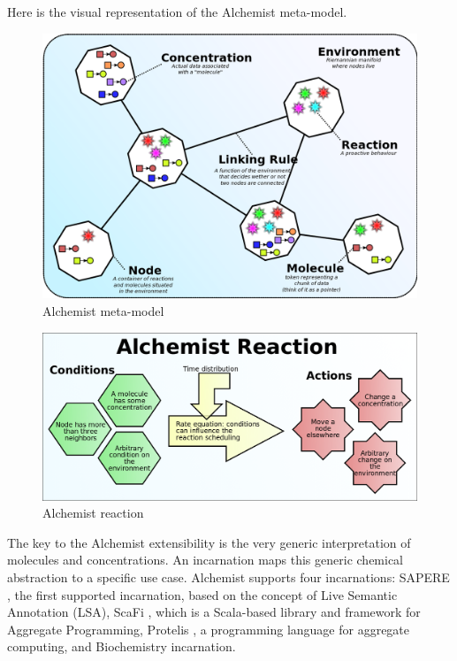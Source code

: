 \documentclass[12pt,a4paper,openright,twoside]{book}
\begin{document}
Here is the visual representation of the Alchemist meta-model.

\begin{figure}[h!]
  \centering
  \includegraphics[width=\textwidth]{figures/alchemist-model.png}
  \caption{Alchemist meta-model}
\end{figure}

\begin{figure}[h!]
  \centering
  \includegraphics[width=\textwidth]{figures/alchemist-reaction.png}
  \caption{Alchemist reaction}
\end{figure}

The key to the Alchemist extensibility is the very generic interpretation of molecules and concentrations. An incarnation maps this generic chemical abstraction to a specific use case.
Alchemist supports four incarnations:
SAPERE \cite{DBLP:conf/saso/CastelliMRZ11}, the first supported incarnation, based on the concept of Live Semantic Annotation (LSA),
ScaFi \cite{DBLP:journals/softx/CasadeiVAP22}, which is a Scala-based library and framework for Aggregate Programming,
Protelis \cite{DBLP:conf/sac/PianiniVB15}, a programming language for aggregate computing, and
Biochemistry incarnation.
\end{document}
